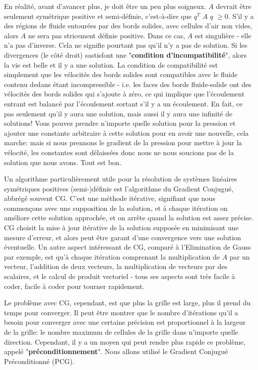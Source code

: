 \documentclass[11pt]{report}
\begin{document}
En réalité, avant d'avancer plus, je doit être un peu plus soigneux. $A$ devrait être seulement symétrique positive et semi-définie, c'est-à-dire que $q^T\,\, A \,\,q\,\, \geq 0$. S'il y a des régions de fluide entourées par des bords solides, avec cellules d'air non vides, alors $A$ ne sera pas stricement définie positive. Dans ce cas, $A$ est singulière - elle n'a pas d'inverse. Cela ne signifie pourtant pas qu'il n'y a pas de solution. Si les divergences (le côté droit) sastisfont une "\textbf{condition d'incompatibilité}", alors la vie est belle et il y a une solution. La condition de compatibilité est simplement que les vélocités des bords solides sont compatibles avec le fluide contenu dedans étant incompressible - i.e. les faces des bords fluide-solide ont des vélocités des bords solides qui s'ajoute à zéro, ce qui implique que l'écoulement entrant est balancé par l'écoulement sortant s'il y a un écoulement. En fait, ce pas seulement qu'il y aura une solution, mais aussi il y aura une infinité de solutions! Vous pouvez prendre n'importe quelle solution pour la pression et ajouter une constante arbitraire à cette solution pour en avoir une nouvelle, cela marche: mais si nous prennons le gradient de la pression pour mettre à jour la vélocité, les constantes sont délaissées donc nous ne nous soucions pas de la solution que nous avons. Tout est bon. \newline

Un algorithme particulièrement utile pour la résolution de systèmes linéaires symétriques positives (semi-)définie est l'algorithme du Gradient Conjugué, abbrégé souvent CG. C'est une méthode itérative, signifiant que nous commençons avec une supposition de la solution, et à chaque itération on améliore cette solution approchée, et on arrête quand la solution est assez précise. CG choisit la mise à jour itérative  de la solution supposée en minimisant une mesure d'erreur, et alors peut être garant d'une convergence vers une solution éventuelle. Un autre aspect intéressant de CG, comparé à l'Elimination de Gauss par exemple, est qu'à chaque itération  comprenant la multiplication de $A$ par un vecteur, l'addition de deux vecteurs, la multiplication de vecteurs par des scalaires, et le calcul de produit vectoriel - tous ses aspects sont très facile à coder, facile à coder pour tourner rapidement. \newline

Le problème avec CG, cependant, est que plus la grille est large, plus il prend du temps pour converger. Il peut être montrer que le nombre d'itérations qu'il a besoin pour converger avec une certaine précision est proportionnel à la largeur de la grille: le nombre maximum de cellules de la grille dans n'importe quelle direction. Cependant, il y a un moyen qui peut rendre plus rapide ce problème, appelé "\textbf{préconditionnement}". Nous allons utilisé le Gradient Conjugué Préconditionné (PCG). \newline
\end{document}
